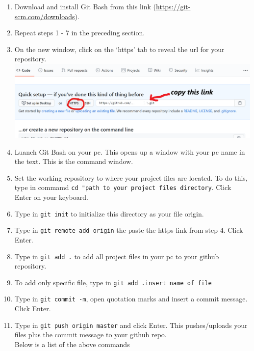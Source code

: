 \documentclass[
]{book}
\providecommand{\tightlist}{%
  \setlength{\itemsep}{0pt}\setlength{\parskip}{0pt}}
\begin{document}
\begin{enumerate}
\def\labelenumi{\arabic{enumi}.}
\tightlist
\item
  Download and install Git Bash from this link (\url{https://git-scm.com/downloads}).\\
\item
  Repeat steps 1 - 7 in the preceding section.\\
\item
  On the new window, click on the `https' tab to reveal the url for your repository.
  \includegraphics{tutorial_screenshots/gh_repolink.png}
\item
  Luanch Git Bash on your pc. This opens up a window with your pc name in the text. This is the command window.\\
\item
  Set the working repository to where your project files are located. To do this, type in commamd \texttt{cd\ "path\ to\ your\ project\ files\ directory}. Click Enter on your keyboard.\\
\item
  Type in \texttt{git\ init} to initialize this directory as your file origin.\\
\item
  Type in \texttt{git\ remote\ add\ origin} the paste the https link from step 4. Click Enter.\\
\item
  Type in \texttt{git\ add\ .} to add all project files in your pc to your github repository.\\
\item
  To add only specific file, type in \texttt{git\ add\ .insert\ name\ of\ file}\\
\item
  Type in \texttt{git\ commit\ -m}, open quotation marks and insert a commit message. Click Enter.\\
\item
  Type in \texttt{git\ push\ origin\ master} and click Enter. This pushes/uploads your files plus the commit message to your github repo.\\
  Below is a list of the above commands
\end{enumerate}
\end{document}
